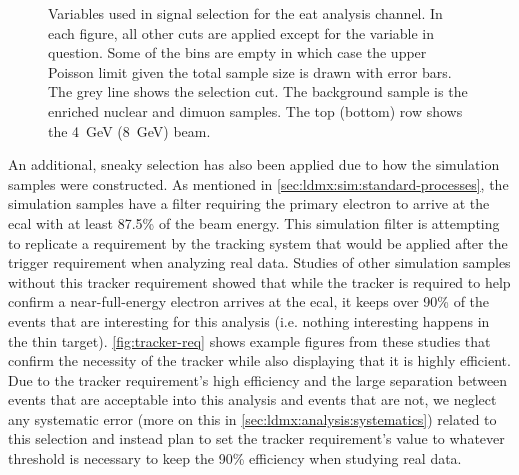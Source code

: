\begin{figure}
\begin{subfigure}{0.48\textwidth}
    \end{subfigure}
    \caption{Variables used in signal selection for the \ac{eat} analysis channel.
    In each figure, all other cuts are applied except for the variable in question.
    Some of the bins are empty in which case the upper Poisson limit given the total
    sample size is drawn with error bars.
    The grey line shows the selection cut.
    The background sample is the enriched nuclear and dimuon samples.
    The top (bottom) row shows the \qty{4}{\GeV} (\qty{8}{\GeV}) beam.
    }
    \label{fig:selection-variables}
\end{figure}

\begin{table}
    \centering
    
    \caption{
      Cut-flow analysis comparing background and various signal hypotheses for the simple cuts used in this analysis.
      The event yield for the background sample is calculated using the event weights
      and represent the number of events out of $10^{13}$ EoT equivalent.
      The signal efficiency is relative to the full simulation sample.
      The efficiency and event yield values on a given row are for \emph{after} the analysis stage of that row.
      The first table is the cutflow for the \qty{4}{\GeV} beam, and the second table is for the \qty{8}{\GeV} beam.
    }
    \label{tab:cutflow}
\end{table}

An additional, sneaky selection has also been applied due to how the simulation samples were constructed.
As mentioned in \cref{sec:ldmx:sim:standard-processes}, the simulation samples have a filter requiring
the primary electron to arrive at the \ac{ecal} with at least 87.5\% of the beam energy.
This simulation filter is attempting to replicate a requirement by the tracking system that would
be applied after the trigger requirement when analyzing real data.
Studies of other simulation samples without this tracker requirement showed that while the tracker is
required to help confirm a near-full-energy electron arrives at the \ac{ecal}, it keeps over 90\% of the 
events that are interesting for this analysis (i.e. nothing interesting happens in the thin target).
\cref{fig:tracker-req} shows example figures from these studies that confirm the necessity of the tracker
while also displaying that it is highly efficient.
Due to the tracker requirement's high efficiency and the large separation between events that are acceptable
into this analysis and events that are not, we neglect any systematic error (more on this in \cref{sec:ldmx:analysis:systematics})
related to this selection and instead plan to set the tracker requirement's value to whatever threshold is necessary
to keep the 90\% efficiency when studying real data.

